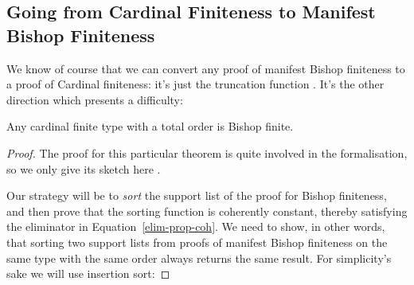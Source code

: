 \subsection{Going from Cardinal Finiteness to Manifest Bishop Finiteness}
We know of course that we can convert any proof of manifest Bishop finiteness to
a proof of Cardinal finiteness: it's just the truncation function
\AgdaInductiveConstructor{\(\lvert \_ \rvert\)}.
It's the other direction which presents a difficulty:
\begin{theorem} \label{cardinal-to-manifest-bishop}
  Any cardinal finite type with a total order is Bishop finite. 
\end{theorem}
\begin{proof}
The proof for this particular theorem is quite involved in the formalisation, so
we only give its sketch here .

Our strategy will be to \emph{sort} the support list of the proof for Bishop
finiteness, and then prove that the sorting function is coherently constant,
thereby satisfying the eliminator in Equation~\ref{elim-prop-coh}.
We need to show, in other words, that sorting two support lists from proofs of
manifest Bishop finiteness on the same type with the same order always returns
the same result.
For simplicity's sake we will use insertion sort:


\end{proof}
